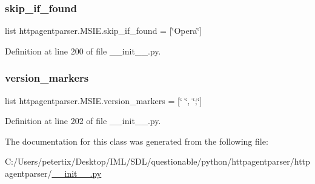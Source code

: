 \subsubsection{\texorpdfstring{skip\+\_\+if\+\_\+found}{skip\_if\_found}}
{\footnotesize\ttfamily list httpagentparser.\+M\+S\+I\+E.\+skip\+\_\+if\+\_\+found = \mbox{[}\char`\"{}Opera\char`\"{}\mbox{]}\hspace{0.3cm}{\ttfamily [static]}}



Definition at line 200 of file \+\_\+\+\_\+init\+\_\+\+\_\+.\+py.

\hypertarget{classhttpagentparser_1_1_m_s_i_e_ae1967418e8868b3137cb1090f82587dd}{}\label{classhttpagentparser_1_1_m_s_i_e_ae1967418e8868b3137cb1090f82587dd} 
\subsubsection{\texorpdfstring{version\+\_\+markers}{version\_markers}}
{\footnotesize\ttfamily list httpagentparser.\+M\+S\+I\+E.\+version\+\_\+markers = \mbox{[}\char`\"{} \char`\"{}, \char`\"{};\char`\"{}\mbox{]}\hspace{0.3cm}{\ttfamily [static]}}



Definition at line 202 of file \+\_\+\+\_\+init\+\_\+\+\_\+.\+py.



The documentation for this class was generated from the following file\+:\begin{DoxyCompactItemize}
\item 
C\+:/\+Users/petertix/\+Desktop/\+I\+M\+L/\+S\+D\+L/questionable/python/httpagentparser/httpagentparser/\hyperlink{____init_____8py}{\+\_\+\+\_\+init\+\_\+\+\_\+.\+py}\end{DoxyCompactItemize}
